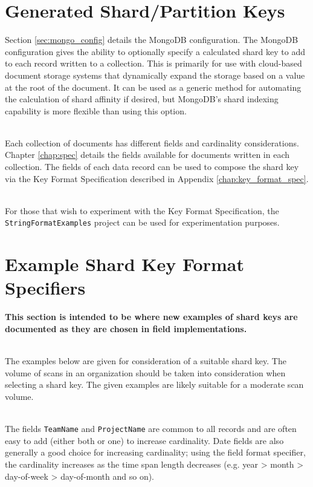 \section{Generated Shard/Partition Keys}
Section \ref{sec:mongo_config} details the MongoDB configuration.  The MongoDB configuration gives the ability to optionally specify a calculated
shard key to add to each record written to a collection.  This is primarily for use with cloud-based document storage systems that dynamically
expand the storage based on a value at the root of the document.  It can be used as a generic method for automating the calculation of shard
affinity if desired, but MongoDB's shard indexing capability is more flexible than using this option.

\noindent\\Each collection of documents has different fields and cardinality considerations.  Chapter \ref{chap:spec} details the fields
available for documents written in each collection.  The fields of each data record can be used to compose the shard key via
the Key Format Specification described in Appendix \ref{chap:key_format_spec}.

\noindent\\For those that wish to experiment with the Key Format Specification, the \texttt{StringFormatExamples} project can be used
for experimentation purposes.


\section{Example Shard Key Format Specifiers}

\textbf{This section is intended to be where new examples of shard keys are documented as they are chosen in field implementations.}

\noindent\\The examples below are given for consideration of a suitable shard key.  The volume of scans in an organization should be taken into
consideration when selecting a shard key.  The given examples are likely suitable for a moderate scan volume.

\noindent\\The fields \texttt{TeamName} and \texttt{ProjectName} are common to all records and are often easy to add (either both or one)
to increase cardinality.  Date fields are also generally a good choice for increasing cardinality; using the field format specifier, the cardinality increases as the
time span length decreases (e.g. year > month > day-of-week > day-of-month and so on).


